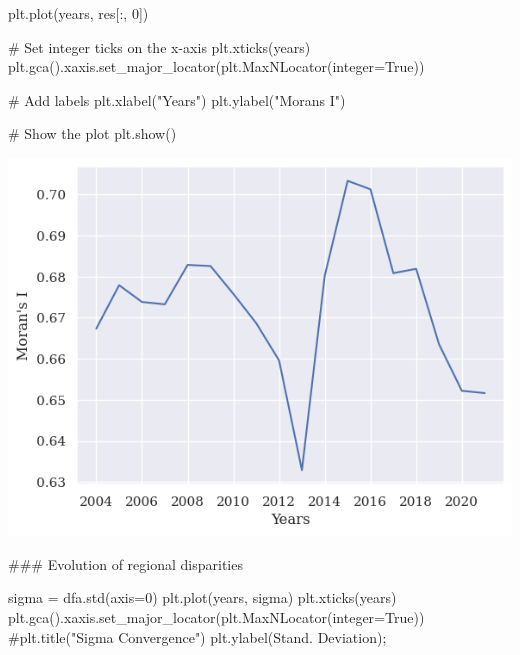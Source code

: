 \documentclass[
  letterpaper,
  DIV=11,
  numbers=noendperiod]{scrreprt}
\newenvironment{Shaded}{\begin{snugshade}}{\end{snugshade}}
\newcommand{\CommentTok}[1]{\textcolor[rgb]{0.37,0.37,0.37}{#1}}
\newcommand{\DecValTok}[1]{\textcolor[rgb]{0.68,0.00,0.00}{#1}}
\newcommand{\NormalTok}[1]{\textcolor[rgb]{0.00,0.23,0.31}{#1}}
\newcommand{\OperatorTok}[1]{\textcolor[rgb]{0.37,0.37,0.37}{#1}}
\newcommand{\StringTok}[1]{\textcolor[rgb]{0.13,0.47,0.30}{#1}}
\newcommand{\VariableTok}[1]{\textcolor[rgb]{0.07,0.07,0.07}{#1}}
\begin{document}
\begin{Shaded}
\begin{Highlighting}[]

\NormalTok{plt.plot(years, res[:, }\DecValTok{0}\NormalTok{])}

\CommentTok{\# Set integer ticks on the x{-}axis}
\NormalTok{plt.xticks(years)}
\NormalTok{plt.gca().xaxis.set\_major\_locator(plt.MaxNLocator(integer}\OperatorTok{=}\VariableTok{True}\NormalTok{))}

\CommentTok{\# Add labels}
\NormalTok{plt.xlabel(}\StringTok{"Years"}\NormalTok{)}
\NormalTok{plt.ylabel(}\StringTok{"Moran\textquotesingle{}s I"}\NormalTok{)}

\CommentTok{\# Show the plot}
\NormalTok{plt.show()}
\end{Highlighting}
\end{Shaded}

\includegraphics{labs/final_informal_files/figure-pdf/cell-23-output-1.png}

\begin{Shaded}
\begin{Highlighting}[]
\CommentTok{\#\#\# Evolution of regional disparities}
\end{Highlighting}
\end{Shaded}

\begin{Shaded}
\begin{Highlighting}[]
\NormalTok{sigma }\OperatorTok{=}\NormalTok{ dfa.std(axis}\OperatorTok{=}\DecValTok{0}\NormalTok{)}
\NormalTok{plt.plot(years, sigma)}
\NormalTok{plt.xticks(years)}
\NormalTok{plt.gca().xaxis.set\_major\_locator(plt.MaxNLocator(integer}\OperatorTok{=}\VariableTok{True}\NormalTok{))}
\CommentTok{\#plt.title("Sigma Convergence")}
\NormalTok{plt.ylabel(}\StringTok{\textquotesingle{}Stand. Deviation\textquotesingle{}}\NormalTok{)}\OperatorTok{;}
\end{Highlighting}
\end{Shaded}
\end{document}
